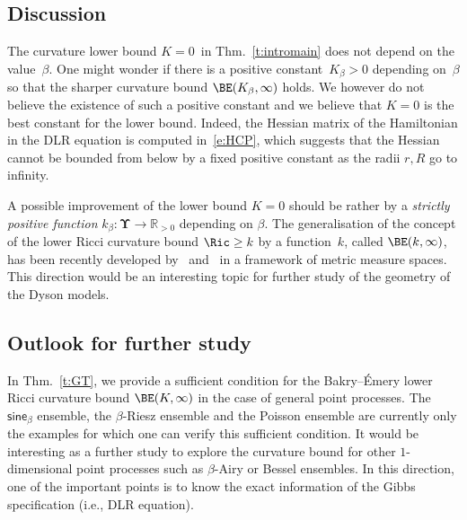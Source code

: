 \documentclass[11pt,letterpaper]{amsart}
\newcommand{\R}{{\mathbb R}}
\newcommand{\dUpsilon}{{\mathbf \Upsilon}}
\newcommand{\U}{\dUpsilon}
\newcommand{\sine}{\mathsf{sine}}
\renewcommand{\1}{\mathbf 1}
\numberwithin{equation}{section}
\theoremstyle{plain}
\theoremstyle{definition}
\theoremstyle{remark}
\begin{document}
\subsection*{Discussion}The curvature lower bound $K=0$~in Thm.~\ref{t:intromain} does not depend on the value~$\beta$. One might wonder if there is a positive constant~$K_\beta>0$ depending on~$\beta$ so that the sharper curvature bound $\BE(K_\beta, \infty)$ holds. We however do not believe the existence of such a positive constant and we believe that $K=0$ is the best constant for the lower bound. Indeed, the Hessian matrix of the Hamiltonian in the DLR equation is computed in~\eqref{e:HCP}, which suggests that the Hessian cannot be bounded from below by a fixed positive constant as the radii $r, R$ go to infinity. 

A possible improvement of the lower bound $K=0$ should be rather by a {\it strictly positive function} $k_\beta: \U \to \R_{>0}$ depending on $\beta$. The generalisation of the concept of the lower Ricci curvature bound $\Ric \ge k$ by a function~$k$, called $\BE(k, \infty)$, has been recently developed by~\cite{Stu15} and~\cite{BraHabStu21} in a framework of metric measure spaces. This direction would be an interesting topic for further study of the geometry of the Dyson models. 

\subsection*{Outlook for further study}
In Thm.~\ref{t:GT}, we provide a sufficient condition for the Bakry--\'Emery lower Ricci curvature bound $\BE(K,\infty)$ in the case of general point processes.
The $\sine_\beta$ ensemble, the $\beta$-Riesz ensemble and the Poisson ensemble are currently only the examples for which one can verify this sufficient condition. It would be interesting as a further study to explore the curvature bound for other $1$-dimensional point processes such as $\beta$-Airy or Bessel ensembles. In this direction, one of the important points is to know the exact information of the Gibbs specification (i.e., DLR equation).
\end{document}
